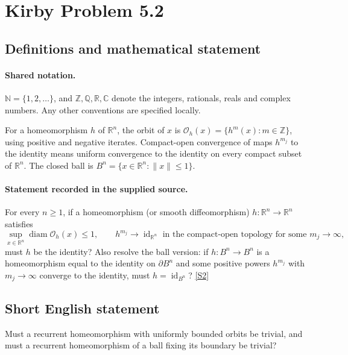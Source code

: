 \documentclass[11pt]{article}
\newcommand{\sref}[2]{\hyperlink{source:#1:#2}{[S#2]}}
\begin{document}
\section{Kirby Problem 5.2}\label{statement}

\subsection{Definitions and mathematical statement}

\paragraph{Shared notation.}$\mathbb N=\{1,2,\ldots\}$, and $\mathbb Z,\mathbb Q,\mathbb R,\mathbb C$ denote the integers, rationals, reals and complex numbers. Any other conventions are specified locally.


For a homeomorphism $h$ of $\mathbb R^n$, the orbit of $x$ is $\mathcal O_h(x)=\{h^m(x):m\in\mathbb Z\}$, using positive and negative iterates. Compact-open convergence of maps $h^{m_j}$ to the identity means uniform convergence to the identity on every compact subset of $\mathbb R^n$. The closed ball is $B^n=\{x\in\mathbb R^n:\|x\|\leq1\}$.
\paragraph{Statement recorded in the supplied source.}
For every $n\geq1$, if a homeomorphism (or smooth diffeomorphism) $h:\mathbb R^n\to\mathbb R^n$ satisfies
\[
 \sup_{x\in\mathbb R^n}\operatorname{diam}\mathcal O_h(x)\leq1,
 \qquad h^{m_j}\longrightarrow\operatorname{id}_{\mathbb R^n}
 \text{ in the compact-open topology for some }m_j\to\infty,
\]
must $h$ be the identity? Also resolve the ball version: if $h:B^n\to B^n$ is a homeomorphism equal to the identity on $\partial B^n$ and some positive powers $h^{m_j}$ with $m_j\to\infty$ converge to the identity, must $h=\operatorname{id}_{B^n}$? \sref{statement}{2}
\subsection{Short English statement}
Must a recurrent homeomorphism with uniformly bounded orbits be trivial, and must a recurrent homeomorphism of a ball fixing its boundary be trivial?
\end{document}
